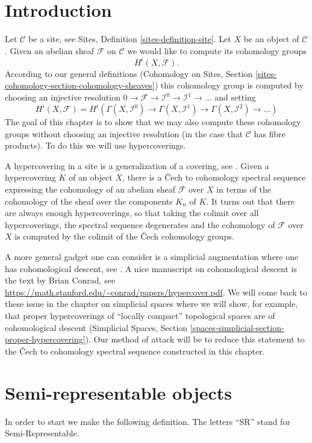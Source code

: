 \section{Introduction}
\label{hypercovering-section-introduction}
Let $\mathcal{C}$ be a site, see Sites, Definition \ref{sites-definition-site}.
Let $X$ be an object of $\mathcal{C}$.
Given an abelian sheaf $\mathcal{F}$
on $\mathcal{C}$ we would like to compute
its cohomology groups
$$
H^i(X, \mathcal{F}).
$$
According to our general definitions (Cohomology on Sites, Section
\ref{sites-cohomology-section-cohomology-sheaves})
this cohomology group is computed by
choosing an injective resolution
$
0 \to \mathcal{F} \to \mathcal{I}^0 \to \mathcal{I}^1 \to \ldots
$
and setting
$$
H^i(X, \mathcal{F})
=
H^i(
\Gamma(X, \mathcal{I}^0) \to
\Gamma(X, \mathcal{I}^1) \to
\Gamma(X, \mathcal{I}^2)\to \ldots)
$$
The goal of this chapter is to show that we may also compute these
cohomology groups without choosing an injective resolution
(in the case that $\mathcal{C}$ has fibre products). To do this
we will use hypercoverings.

\medskip\noindent
A hypercovering in a site is a generalization of a covering, see
\cite[Expos\'e V, Sec. 7]{SGA4}. Given a hypercovering $K$ of an object
$X$, there is a {\v C}ech to cohomology spectral sequence
expressing the cohomology of an abelian sheaf $\mathcal{F}$
over $X$ in terms of the cohomology of the sheaf over the
components $K_n$ of $K$. It turns out that there are always
enough hypercoverings, so that taking the colimit over all hypercoverings,
the spectral sequence degenerates and the cohomology of $\mathcal{F}$
over $X$ is computed by the colimit of the {\v C}ech cohomology groups.

\medskip\noindent
A more general gadget one can consider is a simplicial augmentation where
one has cohomological descent, see \cite[Expos\'e Vbis]{SGA4}. A nice
manuscript on cohomological descent is the text by Brian Conrad, see
\url{https://math.stanford.edu/~conrad/papers/hypercover.pdf}.
We will come back to these issue in the chapter on simplicial spaces
where we will show, for example, that proper hypercoverings of
``locally compact'' topological spaces are of cohomological
descent (Simplicial Spaces, Section
\ref{spaces-simplicial-section-proper-hypercovering}).
Our method of attack will be to reduce this statement to the {\v C}ech to
cohomology spectral sequence constructed in this chapter.

\section{Semi-representable objects}
\label{hypercovering-section-semi-representable}
In order to start we make the following definition.
The letters ``SR'' stand for Semi-Representable.

